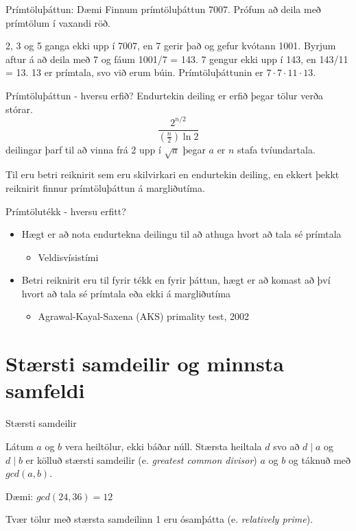 \documentclass[handout]{beamer}
\begin{document}
\begin{frame}{Prímtöluþáttun: Dæmi}
Finnum prímtöluþáttun 7007. Prófum að deila með prímtölum í vaxandi röð.

2, 3 og 5 ganga ekki upp í 7007, en 7 gerir það og gefur kvótann 1001. Byrjum aftur á að deila með 7 og fáum 1001/7 = 143. 7 gengur ekki upp í 143, en 143/11 = 13. 13 er prímtala, svo við erum búin. Prímtöluþáttunin er $7 \cdot 7 \cdot 11 \cdot 13$.
\end{frame}

\begin{frame}{Prímtöluþáttun - hversu erfið?}
    Endurtekin deiling er erfið þegar tölur verða stórar.
    \[
        \frac{2^{n/2}}{\left(\frac{n}{2}\right)\ln 2}
    \]
    deilingar þarf til að vinna frá 2 upp í $\sqrt{a}$ þegar $a$ er $n$ stafa tvíundartala.

    Til eru betri reiknirit sem eru skilvirkari en endurtekin deiling, en ekkert þekkt reiknirit finnur prímtöluþáttun á margliðutíma.
\end{frame}

\begin{frame}{Prímtölutékk - hversu erfitt?}
\begin{itemize}
 \item Hægt er að nota endurtekna deilingu til að athuga hvort að tala sé prímtala
 \begin{itemize}
  \item Veldisvísistími
 \end{itemize}
 \item Betri reiknirit eru til fyrir tékk en fyrir þáttun, hægt er að komast að því hvort að tala sé prímtala eða ekki á margliðutíma
 \begin{itemize}
  \item Agrawal-Kayal-Saxena (AKS) primality test, 2002
 \end{itemize}
\end{itemize}
\end{frame}

\section{Stærsti samdeilir og minnsta samfeldi}

\begin{frame}{Stærsti samdeilir}
\begin{tcolorbox}[title=Stærsti samdeilir]
Látum $a$ og $b$ vera heiltölur, ekki báðar núll. Stærsta heiltala $d$ svo að $d\mid a$ og $d\mid b$ er kölluð stærsti samdeilir (e. \emph{greatest common divisor}) $a$ og $b$ og táknuð með $gcd(a, b)$.
\end{tcolorbox}
Dæmi: $gcd(24, 36) = 12$

Tvær tölur með stærsta samdeilinn 1 eru ósamþátta (e. \emph{relatively prime}).
\end{frame}
\end{document}
